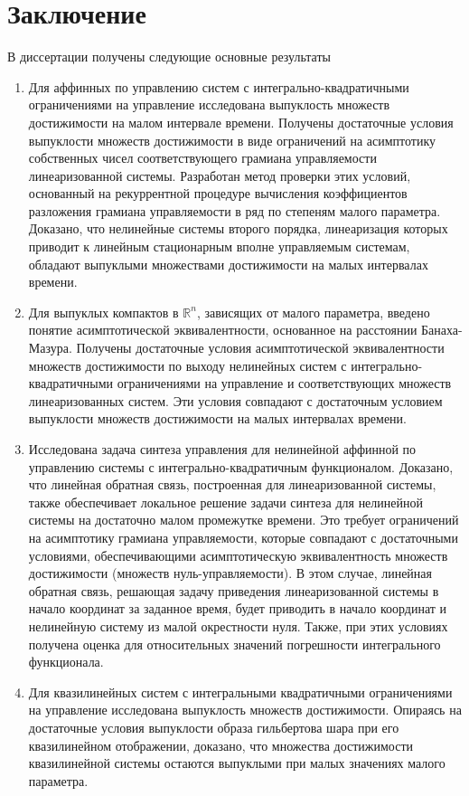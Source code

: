 \documentclass[../main.tex]{subfiles}
\begin{document}
\clearpage
\section*{Заключение}
В диссертации получены следующие основные результаты
\begin{enumerate}
	\item Для аффинных по управлению систем с интегрально-квадратичными ограничениями на управление исследована выпуклость множеств достижимости на малом интервале времени.
	Получены достаточные условия выпуклости множеств достижимости в виде ограничений на асимптотику собственных чисел соответствующего грамиана управляемости линеаризованной системы.
	Разработан метод проверки этих условий, основанный на рекуррентной процедуре вычисления коэффициентов разложения грамиана управляемости в ряд по степеням малого параметра.
	Доказано, что нелинейные системы второго порядка, линеаризация которых приводит к линейным стационарным вполне управляемым системам, обладают выпуклыми множествами достижимости на малых интервалах времени.
	
	\item Для выпуклых компактов в $\mathbb{R}^n$, зависящих от малого параметра, введено понятие асимптотической эквивалентности, основанное на расстоянии Банаха-Мазура.
	Получены достаточные условия асимптотической эквивалентности множеств достижимости по выходу нелинейных систем с интегрально-квадратичными ограничениями на управление и соответствующих множеств линеаризованных систем. 
	Эти условия совпадают с достаточным условием выпуклости множеств достижимости на малых интервалах времени.
	
	\item Исследована задача синтеза управления для нелинейной аффинной по управлению системы с интегрально-квадратичным функционалом. 
	Доказано, что линейная обратная связь, построенная для линеаризованной системы, также обеспечивает локальное решение задачи синтеза для нелинейной системы на достаточно малом промежутке времени.  
	Это требует ограничений на асимптотику грамиана управляемости, которые совпадают с достаточными условиями, обеспечивающими асимптотическую эквивалентность множеств достижимости (множеств нуль-управляемости). 
	В этом случае, линейная обратная связь, решающая задачу приведения линеаризованной системы в начало координат за заданное время, будет приводить в начало координат и нелинейную систему из малой окрестности нуля.
	Также, при этих условиях получена оценка для относительных значений погрешности интегрального функционала. 
	
	\item Для квазилинейных систем с интегральными квадратичными ограничениями на управление исследована выпуклость множеств достижимости. 
	Опираясь на достаточные условия выпуклости образа гильбертова шара при его квазилинейном отображении, доказано, что множества достижимости квазилинейной системы остаются выпуклыми при малых значениях малого параметра. 
\end{enumerate}
\end{document}
